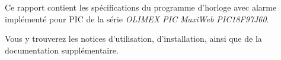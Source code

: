 Ce rapport contient les spécifications du programme d'horloge avec alarme implémenté pour PIC de la série \textit{OLIMEX PIC MaxiWeb PIC18F97J60}.

Vous y trouverez les notices d'utilisation, d'installation, ainsi que de la documentation supplémentaire.
